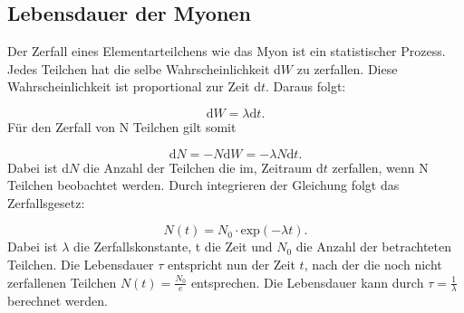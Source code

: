 \subsection{Lebensdauer der Myonen}
Der Zerfall eines Elementarteilchens wie das Myon ist ein statistischer Prozess.
Jedes Teilchen hat die selbe Wahrscheinlichkeit d$W$ zu zerfallen.
Diese Wahrscheinlichkeit ist proportional zur Zeit d$t$.
Daraus folgt: 

\begin{equation}
    \text{d}W = \lambda \text{d}t.
\end{equation}
Für den Zerfall von N Teilchen gilt somit

\begin{equation}
    \text{d}N = - N \text{d}W = - \lambda N \text{d}t.
\end{equation}
Dabei ist d$N$ die Anzahl der Teilchen die im, Zeitraum d$t$ zerfallen, wenn N Teilchen beobachtet werden.
Durch integrieren der Gleichung folgt das Zerfallsgesetz:

\begin{equation}
    N(t) = N_0 \cdot \text{exp}(-\lambda t).
\end{equation}
Dabei ist $\lambda$ die Zerfallskonstante, t die Zeit und $N_0$ die Anzahl der betrachteten Teilchen.
Die Lebensdauer $\tau$ entspricht nun der Zeit $t$, nach der die noch nicht zerfallenen Teilchen $N(t) = \frac{N_0}{e}$ entsprechen.
Die Lebensdauer kann durch $\tau = \frac{1}{\lambda}$ berechnet werden.
